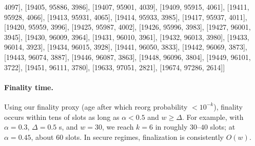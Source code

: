 4097], [19405, 95886, 3986], [19407, 95901, 4039], [19409, 95915, 4061], [19411, 95928, 4066], [19413, 95931, 4065], [19414, 95933, 3985], [19417, 95937, 4011], [19420, 95959, 3996], [19425, 95987, 4002], [19426, 95996, 3983], [19427, 96001, 3945], [19430, 96009, 3964], [19431, 96010, 3961], [19432, 96013, 3980], [19433, 96014, 3923], [19434, 96015, 3928], [19441, 96050, 3833], [19442, 96069, 3873], [19443, 96074, 3887], [19446, 96087, 3863], [19448, 96096, 3804], [19449, 96101, 3722], [19451, 96111, 3780], [19633, 97051, 2821], [19674, 97286, 2614]]

\paragraph{Finality time.}
Using our finality proxy (age after which reorg probability $<10^{-k}$), finality occurs within tens of slots as long as $\alpha<0.5$ and $w\ge\Delta$. For example, with $\alpha=0.3$, $\Delta=0.5$ s, and $w=30$, we reach $k=6$ in roughly $30$--$40$ slots; at $\alpha=0.45$, about $60$ slots. In secure regimes, finalization is consistently $O(w)$.



